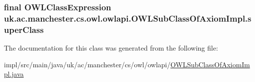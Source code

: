 \hypertarget{classuk_1_1ac_1_1manchester_1_1cs_1_1owl_1_1owlapi_1_1_o_w_l_sub_class_of_axiom_impl_a84b65e43d23b9f6b6932e828bf45a0bb}{
\subsubsection[{super\-Class}]{\setlength{\rightskip}{0pt plus 5cm}final {\bf O\-W\-L\-Class\-Expression} uk.\-ac.\-manchester.\-cs.\-owl.\-owlapi.\-O\-W\-L\-Sub\-Class\-Of\-Axiom\-Impl.\-super\-Class\hspace{0.3cm}{\ttfamily [private]}}}\label{classuk_1_1ac_1_1manchester_1_1cs_1_1owl_1_1owlapi_1_1_o_w_l_sub_class_of_axiom_impl_a84b65e43d23b9f6b6932e828bf45a0bb}


The documentation for this class was generated from the following file\-:\begin{DoxyCompactItemize}
\item 
impl/src/main/java/uk/ac/manchester/cs/owl/owlapi/\hyperlink{_o_w_l_sub_class_of_axiom_impl_8java}{O\-W\-L\-Sub\-Class\-Of\-Axiom\-Impl.\-java}\end{DoxyCompactItemize}

